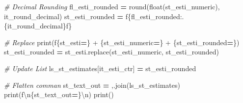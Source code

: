 \documentclass[
]{book}
\newenvironment{Shaded}{\begin{snugshade}}{\end{snugshade}}
\newcommand{\BuiltInTok}[1]{#1}
\newcommand{\CharTok}[1]{\textcolor[rgb]{0.31,0.60,0.02}{#1}}
\newcommand{\CommentTok}[1]{\textcolor[rgb]{0.56,0.35,0.01}{\textit{#1}}}
\newcommand{\NormalTok}[1]{#1}
\newcommand{\OperatorTok}[1]{\textcolor[rgb]{0.81,0.36,0.00}{\textbf{#1}}}
\newcommand{\SpecialCharTok}[1]{\textcolor[rgb]{0.00,0.00,0.00}{#1}}
\newcommand{\SpecialStringTok}[1]{\textcolor[rgb]{0.31,0.60,0.02}{#1}}
\newcommand{\StringTok}[1]{\textcolor[rgb]{0.31,0.60,0.02}{#1}}
\begin{document}
\begin{Shaded}
\begin{Highlighting}[]
        \CommentTok{\# Decimal Rounding}
\NormalTok{        fl\_esti\_rounded }\OperatorTok{=} \BuiltInTok{round}\NormalTok{(}\BuiltInTok{float}\NormalTok{(st\_esti\_numeric), it\_round\_decimal)}
\NormalTok{        st\_esti\_rounded }\OperatorTok{=} \SpecialStringTok{f\textquotesingle{}}\SpecialCharTok{\{}\NormalTok{fl\_esti\_rounded}\SpecialCharTok{:.}\NormalTok{\{it\_round\_decimal\}}\SpecialCharTok{f\}}\SpecialStringTok{\textquotesingle{}}
        
        \CommentTok{\# Replace}
        \BuiltInTok{print}\NormalTok{(}\SpecialStringTok{f\textquotesingle{}}\SpecialCharTok{\{}\NormalTok{st\_esti}\OperatorTok{=}\SpecialCharTok{\}}\SpecialStringTok{ + }\SpecialCharTok{\{}\NormalTok{st\_esti\_numeric}\OperatorTok{=}\SpecialCharTok{\}}\SpecialStringTok{ + }\SpecialCharTok{\{}\NormalTok{st\_esti\_rounded}\OperatorTok{=}\SpecialCharTok{\}}\SpecialStringTok{\textquotesingle{}}\NormalTok{)}
\NormalTok{        st\_esti\_rounded }\OperatorTok{=}\NormalTok{ st\_esti.replace(st\_esti\_numeric, st\_esti\_rounded)}
        
        \CommentTok{\# Update List}
\NormalTok{        ls\_st\_estimates[it\_esti\_ctr] }\OperatorTok{=}\NormalTok{ st\_esti\_rounded}
    
    \CommentTok{\# Flatten comman}
\NormalTok{    st\_text\_out }\OperatorTok{=} \StringTok{\textquotesingle{},\textquotesingle{}}\NormalTok{.join(ls\_st\_estimates)}
    \BuiltInTok{print}\NormalTok{(}\SpecialStringTok{f\textquotesingle{}}\CharTok{\textbackslash{}n}\SpecialCharTok{\{}\NormalTok{st\_text\_out}\OperatorTok{=}\SpecialCharTok{\}}\CharTok{\textbackslash{}n}\SpecialStringTok{\textquotesingle{}}\NormalTok{)}
    \BuiltInTok{print}\NormalTok{()}
\end{Highlighting}
\end{Shaded}
\end{document}
